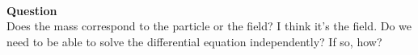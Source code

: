 \documentclass[prb,preprint]
{revtex4-1}
\newcommand{\PRLsep}{\noindent\makebox[\linewidth]{\resizebox{0.8888\linewidth}{2pt}{$\bullet$}}\bigskip}
\begin{document}
\\
\\
\\
\\
\\
\\
\textbf{Question}
\\
Does the mass correspond to the particle or the field?  I think it's the field.  Do we need to be able to solve the differential equation independently?  If so, how?
\\
\PRLsep
\\
\\
\\
\\





\end{document}
